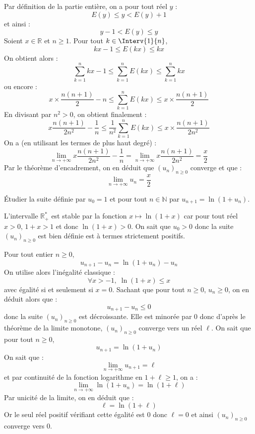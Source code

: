 \documentclass[a4paper,10pt]{report}
\begin{document}
\corr Par définition de la partie entière, on a pour tout réel $y$ :
$$ E(y) \leq y < E(y) + 1 $$
et ainsi :
$$ y-1 < E(y) \leq y$$
Soient $x \in \mathbb{R}$ et $n \geq 1$. Pour tout $k \in \Interv{1}{n}$,
$$ kx - 1 \leq E(kx) \leq kx $$
On obtient alors :
$$ \sum_{k=1}^n kx-1 \leq \sum_{k=1}^n E(kx) \leq \sum_{k=1}^n kx $$
ou encore :
$$ x \times \dfrac{n(n+1)}{2} - n \leq \sum_{k=1}^n E(kx) \leq x \times \dfrac{n(n+1)}{2}$$
En divisant par $n^2 >0$, on obtient finalement :
$$ x \dfrac{n(n+1)}{2n^2} - \dfrac{1}{n} \leq \dfrac{1}{n^2} \sum_{k=1}^n E(kx) \leq x \times \dfrac{n(n+1)}{2n^2}$$
On a (en utilisant les termes de plus haut degré) :
$$ \lim_{n \rightarrow + \infty} x \dfrac{n(n+1)}{2n^2} - \dfrac{1}{n}  = \lim_{n \rightarrow + \infty} x \dfrac{n(n+1)}{2n^2} = \dfrac{x}{2}$$
Par le théorème d'encadrement, on en déduit que $(u_n)_{n \geq 0}$ converge et que :
$$ \lim_{n \rightarrow + \infty} u_n = \dfrac{x}{2}$$

\medskip


\begin{Exa} Étudier la suite définie par $u_0=1$ et pour tout $n \in \mathbb{N}$ par $u_{n+1}=\ln(1+u_n)$.
\end{Exa} 

\corr L'intervalle $\mathbb{R}_+^{*}$ est stable par la fonction $x \mapsto \ln(1+x)$ car pour tout réel $x>0$, $1+x>1$ et donc $\ln(1+x)>0$. On sait que $u_0>0$ donc la suite $(u_n)_{n \geq 0}$ est bien définie est à termes strictement positifs.

\medskip

\noindent Pour tout entier $n \geq 0$,
$$u_{n+1}-u_n = \ln(1+u_n)-u_n $$
On utilise alors l'inégalité classique :
$$ \forall x > -1, \; \ln(1+x) \leq x$$
avec égalité si et seulement si $x=0$. Sachant que pour tout $n \geq 0$, $u_n \geq 0$, on en déduit alors que :
$$ u_{n+1}-u_n \leq 0$$
donc la suite $(u_n)_{n \geq 0}$ est décroissante. Elle est minorée par $0$ donc d'après le théorème de la limite monotone, $(u_n)_{n \geq 0}$ converge vers un réel $\ell$. On sait que pour tout $n \geq 0$,
$$ u_{n+1} = \ln(1+u_n)$$
On sait que :
$$ \lim_{n \rightarrow + \infty} u_{n+1} = \ell$$
et par continuité de la fonction logarithme en $1+ \ell \geq 1$, on a :
$$ \lim_{n \rightarrow + \infty} \ln(1+u_n) = \ln(1+ \ell)$$
Par unicité de la limite, on en déduit que :
$$ \ell = \ln(1+\ell)$$
Or le seul réel positif vérifiant cette égalité est $0$ donc $\ell=0$ et ainsi $(u_n)_{n \geq 0}$ converge vers $0$.

\medskip
\end{document}
